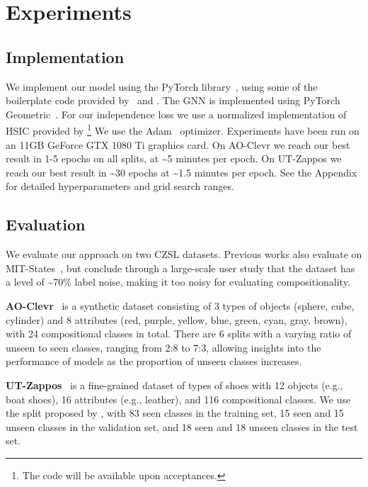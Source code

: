 \documentclass{article}
\begin{document}
\section{Experiments}
\subsection{Implementation}
\label{sec:implementation}
We implement our model using the PyTorch library~\citep{NEURIPS2019_9015}, using some of the boilerplate code provided by~\citet{nagarajan2018attributes} and \citet{purushwalkam2019task}. The GNN is implemented using PyTorch Geometric~\citep{FeyLenssen2019}. For our independence loss we use a normalized implementation of HSIC provided by \citet{DBLP:conf/aaai/MaLK20}\footnote{The code will be available upon acceptances.} We use the Adam~\citep{Kingma2014} optimizer. Experiments have been run on an 11GB GeForce GTX 1080 Ti graphics card.
On AO-Clevr we reach our best result in 1-5 epochs on all splits, at \textasciitilde5 minutes per epoch. On UT-Zappos we reach our best result in \textasciitilde30 epochs at \textasciitilde1.5 minutes per epoch. See the Appendix for detailed hyperparameters and grid search ranges.

\subsection{Evaluation}
\label{sec:eval}
We evaluate our approach on two CZSL datasets. Previous works also evaluate on MIT-States~\citep{isola2015discovering}, but \citet{atzmon2020causal} conclude through a large-scale user study that the dataset has a level of \textasciitilde70\% label noise, making it too noisy for evaluating compositionality.

\textbf{AO-Clevr}~\citep{atzmon2020causal, johnson2017clevr} is a synthetic dataset consisting of 3 types of objects (sphere, cube, cylinder) and 8 attributes (red, purple, yellow, blue, green, cyan, gray, brown), with 24 compositional classes in total. There are 6 splits with a varying ratio of unseen to seen classes, ranging from 2:8 to 7:3, allowing insights into the performance of models as the proportion of unseen classes increases.

\textbf{UT-Zappos}~\citep{yu2014fine} is a fine-grained dataset of types of shoes with 12 objects (e.g., boat shoes), 16 attributes (e.g., leather), and 116 compositional classes. We use the split proposed by \citet{purushwalkam2019task}, with 83 seen classes in the training set, 15 seen and 15 unseen classes in the validation set, and 18 seen and 18 unseen classes in the test set.
\end{document}
